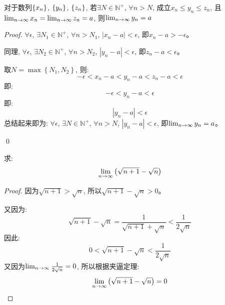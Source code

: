 \begin{theorem}[数列极限的夹逼性定理]
    对于数列$\left\{ x_n\right\}$, $\left\{ y_n\right\}$, $\left\{ z_n\right\}$, 若$\exists N \in \mathbb{N}^+$, $\forall n > N$, 成立$x_n \le y_n \le z_n$, 且$\lim_{n \to \infty } x_n = \lim_{n \to \infty } z_n = a$, 则$\lim_{n \to \infty } y_n = a$
\end{theorem}
\begin{proof}
    $\forall \epsilon$, $\exists N_1 \in \mathbb{N}^+$, $\forall n > N_1$, $\left| x_n - a\right| < \epsilon$, 即$x_n -a > -\epsilon$。

    同理, $\forall \epsilon$, $\exists N_2 \in \mathbb{N}^+$, $\forall n > N_2$, $\left| y_n - a\right| < \epsilon$, 即$z_n -a < \epsilon$。

    取$N = \max\left\{ N_1, N_2 \right\}$, 则:
    \begin{equation*}
        -\epsilon < x_n - a < y_n - a < z_n - a < \epsilon
    \end{equation*}
    即: 
    \begin{equation*}
        -\epsilon < y_n - a <\epsilon
    \end{equation*}
    即:
    \begin{equation*}
        \left| y_n - a \right| < \epsilon
    \end{equation*}
    总结起来即为:
    $\forall \epsilon$, $\exists N \in \mathbb{N}^+$, $\forall n > N$, $\left| y_n - a\right| < \epsilon$, 即$\lim_{n \to \infty } y_n = a$。

    \qed
\end{proof}
\begin{example}
    求: 
    \begin{equation*}
        \lim_{n \to \infty } \left(\sqrt{n+1} - \sqrt{n}\right)
    \end{equation*}
\end{example}
\begin{proof}
    因为$\sqrt{n+1} > \sqrt{n}$, 所以$\sqrt{n+1} - \sqrt{n} > 0$。

    又因为:
    \begin{equation*}
        \sqrt{n+1}-\sqrt{n} = \frac{1}{\sqrt{n+1}+\sqrt{n}} < \frac{1}{2\sqrt{n}}
    \end{equation*}
    因此:
    \begin{equation*}
        0 < \sqrt{n+1} - \sqrt{n} < \frac{1}{2\sqrt{n}}
    \end{equation*}
    又因为$\lim_{n \to \infty } \frac{1}{2\sqrt{n}} = 0$, 所以根据夹逼定理:
    \begin{equation*}
        \lim_{n \to \infty } \left(\sqrt{n+1}-\sqrt{n}\right) = 0
    \end{equation*}
\end{proof}
